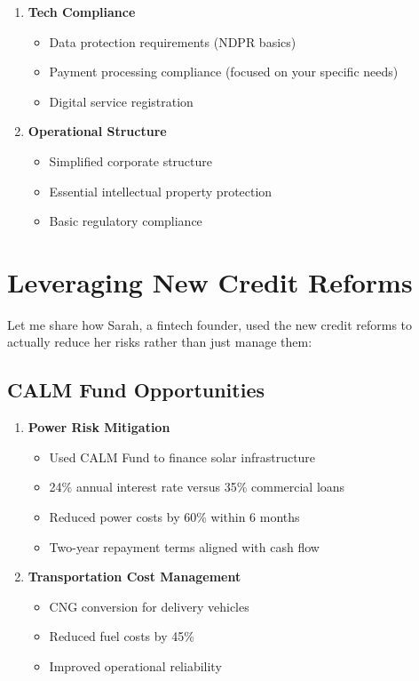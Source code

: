 \begin{enumerate}
    \item \textbf{Tech Compliance}
    \begin{itemize}
        \item Data protection requirements (NDPR basics)
        \item Payment processing compliance (focused on your specific needs)
        \item Digital service registration
    \end{itemize}

    \item \textbf{Operational Structure}
    \begin{itemize}
        \item Simplified corporate structure
        \item Essential intellectual property protection
        \item Basic regulatory compliance
    \end{itemize}
\end{enumerate}

\section{Leveraging New Credit Reforms}\label{sec:new-credit-reforms}

Let me share how Sarah, a fintech founder, used the new credit reforms to actually reduce her risks rather than just manage them:

\subsection{CALM Fund Opportunities}\label{subsec:calm-fund-opportunities}

\begin{enumerate}
    \item \textbf{Power Risk Mitigation}
    \begin{itemize}
        \item Used CALM Fund to finance solar infrastructure
        \item 24\% annual interest rate versus 35\% commercial loans
        \item Reduced power costs by 60\% within 6 months
        \item Two-year repayment terms aligned with cash flow
    \end{itemize}

    \item \textbf{Transportation Cost Management}
    \begin{itemize}
        \item CNG conversion for delivery vehicles
        \item Reduced fuel costs by 45\%
        \item Improved operational reliability
    \end{itemize}
\end{enumerate}

